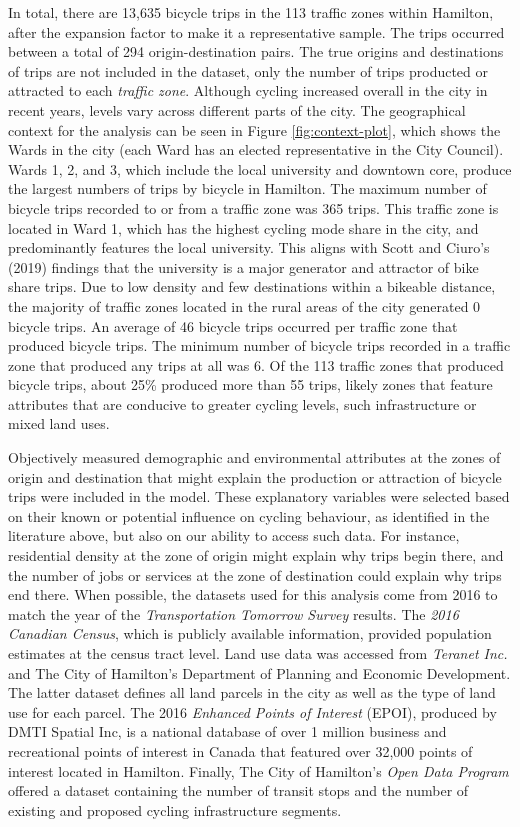 \documentclass[smallextended]{svjour3}       %
\begin{document}
In total, there are 13,635 bicycle trips in the 113 traffic zones within
Hamilton, after the expansion factor to make it a representative sample.
The trips occurred between a total of 294 origin-destination pairs. The
true origins and destinations of trips are not included in the dataset,
only the number of trips producted or attracted to each \emph{traffic
zone}. Although cycling increased overall in the city in recent years,
levels vary across different parts of the city. The geographical context
for the analysis can be seen in Figure \ref{fig:context-plot}, which
shows the Wards in the city (each Ward has an elected representative in
the City Council). Wards 1, 2, and 3, which include the local university
and downtown core, produce the largest numbers of trips by bicycle in
Hamilton. The maximum number of bicycle trips recorded to or from a
traffic zone was 365 trips. This traffic zone is located in Ward 1,
which has the highest cycling mode share in the city, and predominantly
features the local university. This aligns with Scott and Ciuro's (2019)
findings that the university is a major generator and attractor of bike
share trips. Due to low density and few destinations within a bikeable
distance, the majority of traffic zones located in the rural areas of
the city generated 0 bicycle trips. An average of 46 bicycle trips
occurred per traffic zone that produced bicycle trips. The minimum
number of bicycle trips recorded in a traffic zone that produced any
trips at all was 6. Of the 113 traffic zones that produced bicycle
trips, about 25\% produced more than 55 trips, likely zones that feature
attributes that are conducive to greater cycling levels, such
infrastructure or mixed land uses.

Objectively measured demographic and environmental attributes at the
zones of origin and destination that might explain the production or
attraction of bicycle trips were included in the model. These
explanatory variables were selected based on their known or potential
influence on cycling behaviour, as identified in the literature above,
but also on our ability to access such data. For instance, residential
density at the zone of origin might explain why trips begin there, and
the number of jobs or services at the zone of destination could explain
why trips end there. When possible, the datasets used for this analysis
come from 2016 to match the year of the \emph{Transportation Tomorrow
Survey} results. The \emph{2016 Canadian Census}, which is publicly
available information, provided population estimates at the census tract
level. Land use data was accessed from \emph{Teranet Inc.} and The City
of Hamilton's Department of Planning and Economic Development. The
latter dataset defines all land parcels in the city as well as the type
of land use for each parcel. The 2016 \emph{Enhanced Points of Interest}
(EPOI), produced by DMTI Spatial Inc, is a national database of over 1
million business and recreational points of interest in Canada that
featured over 32,000 points of interest located in Hamilton. Finally,
The City of Hamilton's \emph{Open Data Program} offered a dataset
containing the number of transit stops and the number of existing and
proposed cycling infrastructure segments.
\end{document}
